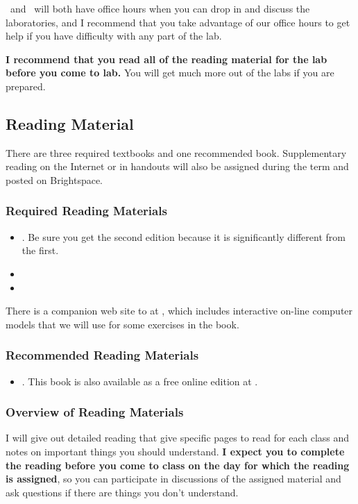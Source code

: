 \documentclass[11pt,twoside]{jgsyllabus}\usepackage[]{graphicx}\usepackage[]{color}
\begin{document}
\TaTitle\ and \ProfTitle\ will both have office hours
when you can drop in and discuss the laboratories, and I recommend that you
take advantage of our office hours to get help if you have difficulty with any
part of the lab.

\textbf{I recommend that you read all of the reading material for the lab
before you come to lab.}
You will get much more out of the labs if you are prepared.

\subsection{Reading Material}
There are three required textbooks and one recommended book.
Supplementary reading on the Internet or in handouts will also be assigned
during the term and posted on Brightspace.

\subsubsection[Required Reading]{Required Reading Materials}
\begin{itemize}
	\item \LongArcher. Be sure you get the second edition because it is
	      significantly different from the first.
	\item \LongNordhaus
	\item \LongPielke
\end{itemize}
There is a companion web site to \emph{\Archer\/} at \ArcherURL, which includes
interactive on-line computer models that we will use for some exercises in the
book.

\subsubsection[Recommended Reading]{Recommended Reading Materials}
\begin{itemize}
  \item \LongWickham. This book is also available as a free online edition at
    \WickhamURL.
\end{itemize}

\subsubsection{Overview of Reading Materials}
I will give out detailed reading that give specific pages to read for each
class and notes on important things you should understand.
\textbf{I expect you to complete the reading before you come to class
  on the day for which the reading is assigned},
  so you can participate in discussions of the assigned material and ask
  questions if there are things you don't understand.  %
\end{document}
